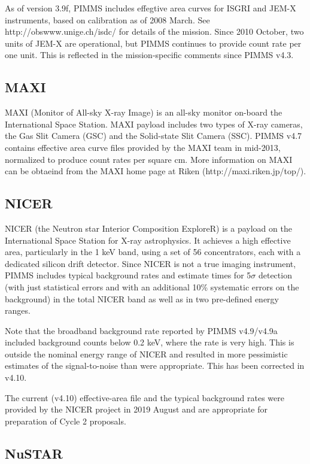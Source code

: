 \documentclass[11pt]{article}
\begin{document}
As of version 3.9f, PIMMS includes effegtive area curves for ISGRI and
JEM-X instruments, based on calibration as of 2008 March.
See http://obswww.unige.ch/isdc/ for details of the mission.
Since 2010 October, two units of JEM-X are operational, but PIMMS continues
to provide count rate per one unit. This is reflected in the mission-specific
comments since PIMMS v4.3.

\subsection{MAXI}
MAXI (Monitor of All-sky X-ray Image) is an all-sky monitor on-board the
International Space Station. MAXI payload includes two types of X-ray cameras,
the Gas Slit Camera (GSC) and the Solid-state Slit Camera (SSC). PIMMS v4.7
contains effective area curve files provided by the MAXI team in mid-2013,
normalized to produce count rates per square cm.  More information on MAXI
can be obtaeind from the MAXI home page at Riken (http://maxi.riken.jp/top/).

\subsection{NICER}

NICER (the Neutron star Interior Composition ExploreR) is a payload on
the International Space Station for X-ray astrophysics. It achieves a
high effective area, particularly in the 1 keV band, using a set of 56
concentrators, each with a dedicated silicon drift detector.  Since
NICER is not a true imaging instrument, PIMMS includes typical background
rates and estimate times for 5$\sigma$ detection (with just statistical
errors and with an additional 10\% systematic errors on the background)
in the total NICER band as well as in two pre-defined energy ranges.

Note that the broadband background rate reported by PIMMS v4.9/v4.9a
included background counts below 0.2 keV, where the rate is very high.
This is outside the nominal energy range of NICER and resulted in more
pessimistic estimates of the signal-to-noise than were appropriate. This
has been corrected in v4.10.

The current (v4.10) effective-area file and the typical background rates
were provided by the NICER project in 2019 August and are appropriate for
preparation of Cycle 2 proposals.

\subsection{NuSTAR}
\end{document}
